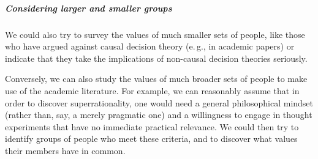 
\subparagraph{Considering larger and smaller
groups}\label{considering-larger-and-smaller-groups}

We could also try to survey the values of much smaller sets of people,
like those who have argued against causal decision theory (e.\,g., in
academic papers) or indicate that they take the implications of
non-causal decision theories seriously.

Conversely, we can also study the values of much broader sets of people
to make use of the academic literature. For example, we can reasonably
assume that in order to discover superrationality, one would need a
general philosophical mindset (rather than, say, a merely pragmatic one)
and a willingness to engage in thought experiments that have no
immediate practical relevance. We could then try to identify groups of
people who meet these criteria, and to discover what values their
members have in common.

